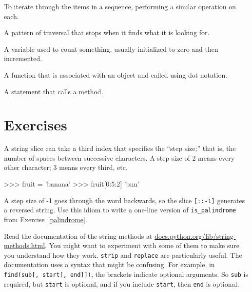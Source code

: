 \begin{vocabulary}[traverse:] To iterate through the items in a sequence,
performing a similar operation on each.
\end{vocabulary}
	
\begin{vocabulary}[search:] A pattern of traversal that stops
when it finds what it is looking for.
\end{vocabulary}
	
\begin{vocabulary}[counter:] A variable used to count something, usually initialized
to zero and then incremented.
\end{vocabulary}
	
\begin{vocabulary}[method:] A function that is associated with an object and called
using dot notation.
\end{vocabulary}
	
\begin{vocabulary}[invocation:] A statement that calls a method.
\end{vocabulary}
	


\section{Exercises}

\begin{exercise}


A string slice can take a third index that specifies the ``step
size;'' that is, the number of spaces between successive characters.
A step size of 2 means every other character; 3 means every third,
etc.

\beforeverb
\begin{pyexo}
>>> fruit = 'banana'
>>> fruit[0:5:2]
'bnn'
\end{pyexo}
\afterverb

A step size of -1 goes through the word backwards, so
the slice \verb"[::-1]" generates a reversed string.
%
%
Use this idiom to write a one-line version of \verb"is_palindrome"
from Exercise~\ref{palindrome}.
\end{exercise}


\begin{exercise}

Read the documentation of the string methods at
\url{docs.python.org/lib/string-methods.html}.  You
might want to experiment with some of them to make sure
you understand how they work.  {\tt strip} and
{\tt replace} are particularly useful.
%
The documentation uses a syntax that might be confusing.
For example, in \verb"find(sub[, start[, end]])", the brackets
indicate optional arguments.  So {\tt sub} is required, but
{\tt start} is optional, and if you include {\tt start},
then {\tt end} is optional.
\end{exercise}

